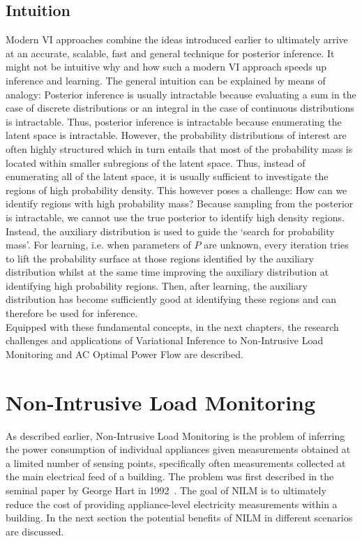 \documentclass[11pt]{cmuthesis} %
\begin{document}
\section{Intuition}
Modern VI approaches combine the ideas introduced earlier to ultimately arrive at an accurate, scalable, fast and general technique for posterior inference. It might not be intuitive why and how such a modern VI approach speeds up inference and learning. The general intuition can be explained by means of analogy: Posterior inference is usually intractable because evaluating a sum in the case of discrete distributions or an integral in the case of continuous distributions is intractable. Thus, posterior inference is intractable because enumerating the latent space is intractable. However, the probability distributions of interest are often highly structured which in turn entails that most of the probability mass is located within smaller subregions of the latent space. Thus, instead of enumerating all of the latent space, it is usually sufficient to investigate the regions of high probability density. This however poses a challenge: How can we identify regions with high probability mass? Because sampling from the posterior is intractable, we cannot use the true posterior to identify high density regions. Instead, the auxiliary distribution is used to guide the `search for probability mass'. For learning, i.e. when parameters of $P$ are unknown, every iteration tries to lift the probability surface at those regions identified by the auxiliary distribution whilst at the same time improving the auxiliary distribution at identifying high probability regions. Then, after learning, the auxiliary distribution has become sufficiently good at identifying these regions and can therefore be used for inference.\\

Equipped with these fundamental concepts, in the next chapters, the research challenges and applications of Variational Inference to Non-Intrusive Load Monitoring and AC Optimal Power Flow are described.

\chapter{Non-Intrusive Load Monitoring}

As described earlier, Non-Intrusive Load Monitoring is the problem of inferring the power consumption of individual appliances given measurements obtained at a limited number of sensing points, specifically often measurements collected at the main electrical feed of a building. The problem was first described in the seminal paper by George Hart in 1992~\cite{hart1992nonintrusive}. The goal of NILM is to ultimately reduce the cost of providing appliance-level electricity measurements within a building. In the next section the potential benefits of NILM in different scenarios are discussed.
\end{document}
